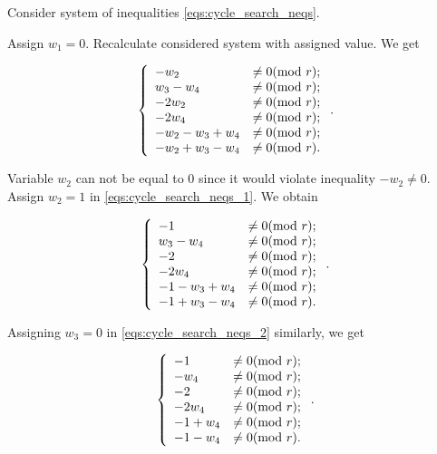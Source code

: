 \documentclass[leqno]{aadmbook}
\renewcommand{\mod}[1]{\textrm{mod}\ #1}
\begin{document}
\begin{section}
Consider system of inequalities \eqref{eqs:cycle_search_neqs}.

Assign $w_1 = 0$. Recalculate considered system with assigned value. We get

\begin{equation}
    \centering
    \left\{
        \begin{array}{ll}
            - w_2 &\neq 0             (\mod{r}); \\
            w_3 - w_4 &\neq 0         (\mod{r}); \\
            - 2 w_2 &\neq 0           (\mod{r}); \\
            - 2 w_4 &\neq 0           (\mod{r}); \\
            - w_2 - w_3 + w_4 &\neq 0 (\mod{r}); \\
            - w_2 + w_3 - w_4 &\neq 0 (\mod{r}). \\
        \end{array}
    \right..
    \label{eqs:cycle_search_neqs_1}
\end{equation}

Variable $w_2$ can not be equal to $0$ since it would violate inequality $- w_2 \neq 0$. Assign $w_2 = 1$ in \eqref{eqs:cycle_search_neqs_1}. We obtain

\begin{equation}
    \centering
    \left\{
        \begin{array}{ll}
            - 1 &\neq 0              (\mod{r}); \\
            w_3 - w_4 &\neq 0        (\mod{r}); \\
            - 2 &\neq 0              (\mod{r}); \\
            - 2 w_4 &\neq 0          (\mod{r}); \\
            - 1 - w_3 + w_4 &\neq 0  (\mod{r}); \\
            - 1 + w_3 - w_4 &\neq 0  (\mod{r}). \\
        \end{array}
    \right..
    \label{eqs:cycle_search_neqs_2}
\end{equation}

Assigning $w_3 = 0$ in \eqref{eqs:cycle_search_neqs_2} similarly, we get

\begin{equation}
    \centering
    \left\{
        \begin{array}{ll}
            - 1 &\neq 0        (\mod{r}); \\
            - w_4 &\neq 0      (\mod{r}); \\
            - 2 &\neq 0        (\mod{r}); \\
            - 2 w_4 &\neq 0    (\mod{r}); \\
            - 1 + w_4 &\neq 0  (\mod{r}); \\
            - 1 - w_4 &\neq 0  (\mod{r}). \\
        \end{array}
    \right..
    \label{eqs:cycle_search_neqs_3}
\end{equation}


\end{section}
\end{document}
